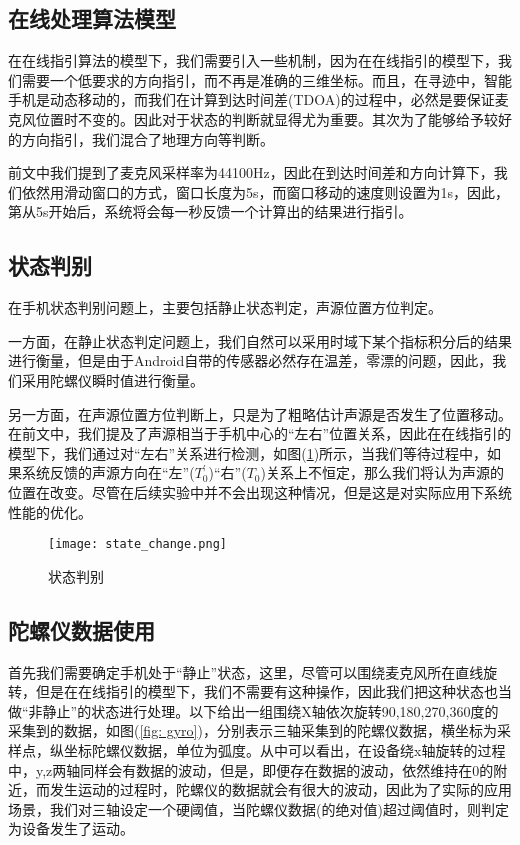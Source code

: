 \documentclass[winfonts]{njuthesis}
\begin{document}
		\subsection{在线处理算法模型}
			
			在在线指引算法的模型下，我们需要引入一些机制，因为在在线指引的模型下，我们需要一个低要求的方向指引，而不再是准确的三维坐标。而且，在寻迹中，智能手机是动态移动的，而我们在计算到达时间差(TDOA)的过程中，必然是要保证麦克风位置时不变的。因此对于状态的判断就显得尤为重要。其次为了能够给予较好的方向指引，我们混合了地理方向等判断。
			
			前文中我们提到了麦克风采样率为44100Hz，因此在到达时间差和方向计算下，我们依然用滑动窗口的方式，窗口长度为5s，而窗口移动的速度则设置为1s，因此，第从5s开始后，系统将会每一秒反馈一个计算出的结果进行指引。
			
		\subsection{状态判别}
		
			在手机状态判别问题上，主要包括静止状态判定，声源位置方位判定。
			
			一方面，在静止状态判定问题上，我们自然可以采用时域下某个指标积分后的结果进行衡量，但是由于Android自带的传感器必然存在温差，零漂的问题，因此，我们采用陀螺仪瞬时值进行衡量。
			
			另一方面，在声源位置方位判断上，只是为了粗略估计声源是否发生了位置移动。在前文中，我们提及了声源相当于手机中心的“左右”位置关系，因此在在线指引的模型下，我们通过对“左右”关系进行检测，如图(\ref{fig: state-change})所示，当我们等待过程中，如果系统反馈的声源方向在“左”($T_0^{'}$)“右”($T_0$)关系上不恒定，那么我们将认为声源的位置在改变。尽管在后续实验中并不会出现这种情况，但是这是对实际应用下系统性能的优化。
			
			\begin{figure}[H]
				\centering
				\texttt{[image: state\_change.png]} 
				\caption{{状态判别}}
				\label{fig: state-change}
			\end{figure}	
						
		\subsection{陀螺仪数据使用}	
		
			首先我们需要确定手机处于“静止”状态，这里，尽管可以围绕麦克风所在直线旋转，但是在在线指引的模型下，我们不需要有这种操作，因此我们把这种状态也当做“非静止”的状态进行处理。以下给出一组围绕X轴依次旋转90,180,270,360度的采集到的数据，如图(\ref{fig: gyro})，分别表示三轴采集到的陀螺仪数据，横坐标为采样点，纵坐标陀螺仪数据，单位为弧度。从中可以看出，在设备绕x轴旋转的过程中，y,z两轴同样会有数据的波动，但是，即便存在数据的波动，依然维持在0的附近，而发生运动的过程时，陀螺仪的数据就会有很大的波动，因此为了实际的应用场景，我们对三轴设定一个硬阈值，当陀螺仪数据(的绝对值)超过阈值时，则判定为设备发生了运动。
		
\end{document}
